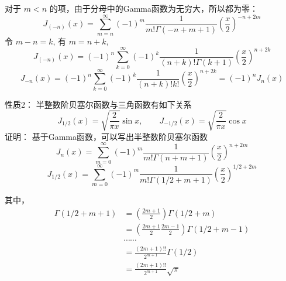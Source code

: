 \begin{frame}
	对于 $m<n$ 的项，由于分母中的Gamma函数为无穷大，所以都为零：
	\begin{equation*}
		J_{(-n)}(x) = \sum\limits_{m=n}^{\infty} (-1)^m  \frac{1}{m! \Gamma(-n+m+1) } (\frac{x}{2})^{-n+2m} 
	\end{equation*}	
	令 $m-n=k$, 有 $m=n+k $, 
	\begin{equation*}
		J_{(-n)}(x) = (-1)^n\sum\limits_{k=0}^{\infty} (-1)^k  \frac{1}{(n+k)! \Gamma(k+1) } (\frac{x}{2})^{n+2k} 
	\end{equation*}	
	\begin{equation*}
		J_{-n} (x) = (-1)^n\sum\limits_{k=0}^{\infty} (-1)^k  \frac{1}{(n+k)! k! } (\frac{x}{2})^{n+2k} =(-1)^n J_{n} (x)
	\end{equation*}	
\end{frame}	

\begin{frame}
	\alert{性质2：} 半整数阶贝塞尔函数与三角函数有如下关系
	\begin{equation*}
		J_{1/2} (x) =\sqrt{\frac{2}{\pi x}} \sin x,  \qquad  J_{-1/2} (x) =\sqrt{\frac{2}{\pi x}} \cos x
	\end{equation*}	
	\alert{证明：}  基于Gamma函数，可以写出半整数阶贝塞尔函数
	\begin{equation*}
		J_n(x) = \sum\limits_{m=0}^{\infty} (-1)^m  \frac{1}{m! \Gamma(n+m+1) } (\frac{x}{2})^{n+2m} 
	\end{equation*}	
	\begin{equation*}
		J_{1/2}(x) = \sum\limits_{m=0}^{\infty} (-1)^m  \frac{1}{m! \Gamma(1/2+m+1) } (\frac{x}{2})^{1/2+2m} 
	\end{equation*}	
\end{frame}	

\begin{frame}
	其中， 
	\begin{equation*}
		\begin{split}
			\Gamma(1/2+m+1) &= (\frac{2m+1}{2}) \Gamma(1/2+m) \\
			& = (\frac{2m+1}{2}\frac{2m-1}{2})  \Gamma(1/2+m-1) \\
			&\cdots \cdots \\
			& = \frac{(2m+1)!!}{2^{m+1}} \Gamma(1/2) \\
			& = \frac{(2m+1)!!}{2^{m+1}} \sqrt{\pi} \\
		\end{split}	
	\end{equation*}	
\end{frame}	

